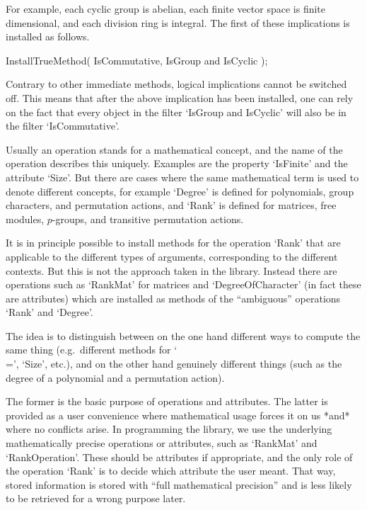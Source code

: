 For example, each cyclic group is abelian,
each finite vector space is finite dimensional,
and each division ring is integral.
The first of these implications is installed as follows.

\begintt
InstallTrueMethod( IsCommutative, IsGroup and IsCyclic );
\endtt

Contrary to other immediate methods,
logical implications cannot be switched off.
This means that after the above implication has been installed,
one can rely on the fact that every object in the filter
`IsGroup and IsCyclic' will also be in the filter `IsCommutative'.


Usually an operation stands for a mathematical concept,
and the name of the operation describes this uniquely.
Examples are the property `IsFinite' and the attribute `Size'.
But there are cases where the same mathematical term is used 
to denote different concepts,
for example `Degree' is defined for polynomials, group characters,
and permutation actions,
and `Rank' is defined for matrices, free modules, $p$-groups,
and transitive permutation actions.

It is in principle possible to install methods for the operation
`Rank' that are applicable to the different types of arguments,
corresponding to the different contexts.
But this is not the approach taken in the {\GAP} library.
Instead there are operations such as `RankMat' for matrices
and `DegreeOfCharacter' (in fact these are attributes)
which are installed as methods of the ``ambiguous'' operations
`Rank' and `Degree'.

The idea is to distinguish between on the one hand different ways
to compute the same thing (e.g.~different methods for `\\=', `Size', etc.),
and on the other hand genuinely different things
(such as the degree of a polynomial and a permutation action).

The former is the basic purpose of operations and attributes.
The latter is provided as a user convenience where mathematical usage
forces it on us *and* where no conflicts arise.
In programming the library, we use the underlying mathematically
precise operations or attributes, such as `RankMat' and
`RankOperation'.
These should be attributes if appropriate, and the only role of the
operation `Rank' is to decide which attribute the user meant.
That way, stored information is stored with ``full mathematical precision''
and is less likely to be retrieved for a wrong purpose later.

